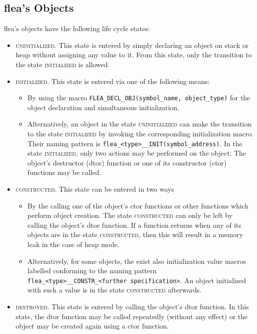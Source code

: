 \documentclass[a4paper,11pt]{scrartcl}
\newcommand{\stateUninit}{\textsc{uninitialized}\xspace}
\newcommand{\stateInit}{\textsc{initialized}\xspace}
\newcommand{\stateCreated}{\textsc{constructed}\xspace}
\newcommand{\stateDestroyed}{\textsc{destroyed}\xspace}
\begin{document}
\subsection{flea's Objects}
\label{secFleaObj}
flea's objects have the following life cycle states:
\begin{itemize}
  \item \stateUninit. This state is entered by simply declaring an object on
    stack or heap without assigning any value to it. From this state, only the
    transition to the state \stateInit is allowed.
  \item \stateInit. This state is entered via one of the following means:
    \begin{itemize} 
        \item By using the macro
    \verb#FLEA_DECL_OBJ(symbol_name, object_type)# for the object declaration
    and simultaneous initialization. 
    \item Alternatively, an object in the state
    \stateUninit can make the transition to the state \stateInit by invoking the
    corresponding initialization macro.
    Their naming pattern is \verb#flea_<type>__INIT(symbol_address)#.
    In the state \stateInit, only two
    actions may be performed on the object: The object's destructor (dtor)
    function or one of its constructor (ctor) functions may be called.
\end{itemize}
  \item \stateCreated. This state can be entered in two ways
    \begin{itemize}
    \item By the calling one of the object's
    ctor functions or other functions which perform object creation. The state
    \stateCreated can only be left by calling the object's dtor function. If a
    function returns when any of its objects are in the state \stateCreated,
    then this will result in a memory leak in the case of heap mode.
    \item Alternatively, for some objects, the exist also initialization value
      macros labelled conforming to the naming pattern
      \verb#flea_<type>__CONSTR_<further specification>#. An object initialized
      with such a value is in the state \stateCreated afterwards.
  \end{itemize}
  \item \stateDestroyed. This state is entered by calling the object's dtor
    function. In this state, the dtor function may be called repeatedly (without
    any effect) or the object may be created again using a ctor function.
\end{itemize}
\end{document}
